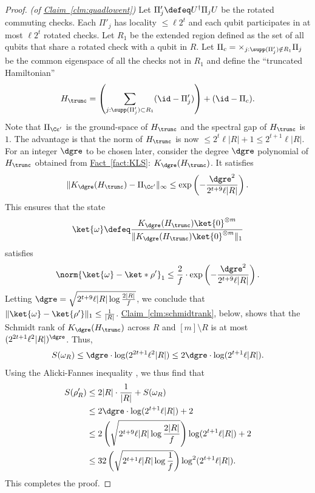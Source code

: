 \documentclass[11pt]{article}
\newcommand{\expref}[2]{\texorpdfstring{\hyperref[#2]{#1~\ref{#2}}}{#1~\ref{#2}}}
\begin{document}
\begin{proof}\textit{(of \expref{Claim}{clm:quadlowent})}
Let $\Pi'_j\defeq U^{\dagger}\Pi_j U$ be the rotated commuting checks.  Each $\Pi'_j$ has locality $\leq\ell 2^t$ and each qubit participates in at most $\ell 2^t$ rotated checks. Let $R_1$ be the extended region defined as the set of all qubits that share a rotated check with a qubit in $R$. Let $\Pi_c = \times_{j: \supp(\Pi'_j)\notin R_1}\Pi_j$ be the common eigenspace of all the checks not in $R_1$ and define the ``truncated Hamiltonian'' 
\begin{align}
H_{\trunc}= \left(\sum_{j:\supp(\Pi'_j)\subset R_1}(\id- \Pi'_j)\right) + (\id-\Pi_c).
\end{align}
Note that $\Pi_{\Cc'}$ is the ground-space of $H_{\trunc}$ and the spectral gap of $H_{\trunc}$ is $1$. The advantage is that the norm of $H_{\trunc}$ is now $\leq 2^t\ell|R|+1 \leq 2^{t+1}\ell|R|$.
For an integer $\dgre$ to be chosen later, consider the degree $\dgre$ polynomial of $H_\trunc$ obtained from \expref{Fact}{fact:KLS}: $K_{\dgre}(H_{\trunc})$. It satisfies 
\begin{align}\|K_{\dgre}(H_{\trunc})-\Pi_{\Cc'}\|_{\infty} \leq \exp\left(-\frac{\dgre^2}{2^{t+9}\ell|R|}\right).
\end{align} 
This ensures that the state 
\begin{align}\ket{\omega} \defeq \frac{K_{\dgre}(H_{\trunc})\ket{0}^{\otimes m}}{\|K_{\dgre}(H_{\trunc})\ket{0}^{\otimes m}\|_1}
\end{align} satisfies \begin{align}\norm{\ket{\omega}-\ket*{\rho'}}_1 \leq \frac{2}{f} \cdot \exp \left(-\frac{\dgre^2}{2^{t+9}\ell|R|}\right).
\end{align}
Letting $\dgre= \sqrt{2^{t+9}\ell|R|\log\frac{2|R|}{f}}$, we conclude that 
$\|\ket{\omega}-\ket{\rho'}\|_1\leq \frac{1}{|R|}$. \expref{Claim}{clm:schmidtrank}, below, shows that the Schmidt rank of $K_{\dgre}(H_{\trunc})$ across $R$ and $[m]\setminus R$ is at most $(2^{2t+1}\ell^2|R|)^{\dgre}$. Thus,
\begin{align}S(\omega_R)\leq \dgre\cdot \log (2^{2t+1}\ell^2|R|)\leq 2\dgre\cdot\log (2^{t+1}\ell|R|).\end{align} Using the Alicki-Fannes inequality \cite{AlickiF04}, we thus find that 
\begin{align}
S(\rho'_R) &\leq 2|R|\cdot \frac{1}{|R|} + S(\omega_R) \\ &\leq 2\dgre\cdot \log (2^{t+1}\ell|R|)+2 \\
&\leq 2\left(\sqrt{2^{t+9}\ell|R|\log\frac{2|R|}{f}}\right)\log(2^{t+1}\ell|R|) +2\\
&\leq 32\left(\sqrt{2^{t+1}\ell|R|\log\frac{1}{f}}\right)\log^2 (2^{t+1}\ell|R|).
\end{align}
This completes the proof.
\end{proof}
\end{document}
